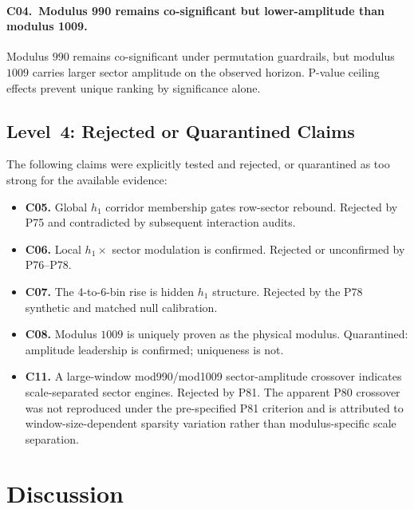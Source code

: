 \documentclass[11pt]{article}
\begin{document}
\paragraph{C04.\ Modulus 990 remains co-significant but lower-amplitude
than modulus 1009.}
Modulus $990$ remains co-significant under permutation guardrails, but
modulus $1009$ carries larger sector amplitude on the observed horizon.
P-value ceiling effects prevent unique ranking by significance alone.

\subsection{Level~4: Rejected or Quarantined Claims}

The following claims were explicitly tested and rejected, or quarantined
as too strong for the available evidence:
\begin{itemize}
    \item \textbf{C05.} Global $h_1$ corridor membership gates
          row-sector rebound. Rejected by P75 and contradicted by
          subsequent interaction audits.

    \item \textbf{C06.} Local $h_1 \times$ sector modulation is
          confirmed. Rejected or unconfirmed by P76--P78.

    \item \textbf{C07.} The 4-to-6-bin rise is hidden $h_1$ structure.
          Rejected by the P78 synthetic and matched null calibration.

    \item \textbf{C08.} Modulus $1009$ is uniquely proven as the
          physical modulus. Quarantined: amplitude leadership is
          confirmed; uniqueness is not.

    \item \textbf{C11.} A large-window mod990/mod1009
          sector-amplitude crossover indicates scale-separated sector
          engines. Rejected by P81. The apparent P80 crossover was
          not reproduced under the pre-specified P81 criterion and is
          attributed to window-size-dependent sparsity variation rather
          than modulus-specific scale separation.
\end{itemize}

\section{Discussion}
\end{document}
